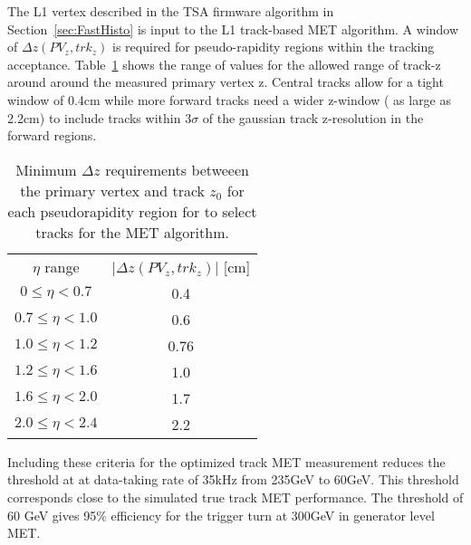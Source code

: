 The L1 vertex described in the TSA firmware algorithm in Section~\ref{sec:FastHisto} is input to the L1 track-based MET algorithm. A window of $\Delta z\left(PV_{z}, trk_{z}\right)$ is required for pseudo-rapidity regions within the tracking acceptance. Table~\ref{tab:zwindows} shows the range of values for the allowed range of track-z around around the measured primary vertex z. Central tracks allow for a tight window of 0.4cm while more forward tracks need a wider z-window ( as large as 2.2cm) to include tracks within $3\sigma$ of the gaussian track z-resolution in the forward regions.
\begin{table}[h]
\begin{tabular}{|c|c|}
$\eta$ range & $\vert \Delta z\left(PV_{z}, trk_{z}\right) \vert$  [cm] \\
 $0\leq \eta < 0.7$ & 0.4\\
$0.7\leq \eta <1.0 $& 0.6\\
$1.0\leq \eta < 1.2 $ & 0.76\\
$1.2\leq \eta < 1.6$ & 1.0 \\
$1.6\leq \eta <  2.0 $& 1.7 \\
$2.0\leq  \eta < 2.4 $ & 2.2 \\
\end{tabular}
\caption{Minimum $\Delta z $ requirements betweeen the primary vertex and track $z_{0}$ for each pseudorapidity region for to select tracks for the MET algorithm. }
\label{tab:zwindows}
\end{table}

Including these criteria for the optimized track MET measurement reduces the threshold at at data-taking rate of 35kHz from 235GeV to 60GeV. This threshold corresponds close to the simulated true track MET performance. The threshold of 60 GeV gives 95$\%$ efficiency for the trigger turn at 300GeV in generator level MET. 



